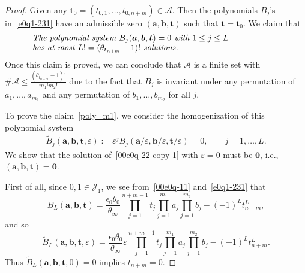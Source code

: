 \documentclass[10pt,a4paper]{amsart}
\numberwithin{equation}{section}
\begin{document}
\begin{proof}
Given any $\boldsymbol t_0=(t_{0,1},\dots,t_{0,n+m})\in \mathcal{A}$. Then the polynomials $B_j$'s in~\eqref{e0q1-231} have an admissible zero $(\boldsymbol a,\boldsymbol b,\boldsymbol t)$ such that $\boldsymbol t=\boldsymbol t_0$. We claim that
\begin{equation} \label{poly=m1}
 \parbox{\dimexpr\linewidth-5em}{\it
 The polynomial system $B_j(\boldsymbol a,\boldsymbol b,\boldsymbol t)=0$ with $1\leq j\leq L$\\ has at most $L!=(\theta_{t_{n+m}}-1)!$ solutions.
 }
\end{equation}
Once this claim is proved, we can conclude that $\mathcal{A}$ is a
finite set with $\# \mathcal{A}\leq
\frac{(\theta_{t_{n+m}}-1)!}{m_1!m_2!}$ due to the fact that $B_j$ is
invariant under any permutation of $a_1,\dots, a_{m_1}$ and any
permutation of $b_1,\dots, b_{m_2}$ for all $j$.

To prove the claim~\eqref{poly=m1}, we consider the homogenization of this polynomial system
\begin{equation}\label{00e0q-22-copy-1}
\begin{split}
\widetilde{B}_j(\boldsymbol a, \boldsymbol b,\boldsymbol t,\varepsilon):=\varepsilon^jB_j({\boldsymbol a}/\varepsilon, {\boldsymbol b}/\varepsilon, \boldsymbol t/\varepsilon)=0,\qquad j=1,\dots, L.
\end{split}
\end{equation}
We show that the solution of~\eqref{00e0q-22-copy-1} with $\varepsilon=0$ must be $\boldsymbol 0$,
i.e., $(\boldsymbol a, \boldsymbol b,\boldsymbol t)=\boldsymbol 0$.

First of all, since $0,1\in\mathcal{J}_1$, we see from~\eqref{00e0q-11} and~\eqref{e0q1-231} that
\begin{equation*}%
B_{L}(\boldsymbol a, \boldsymbol b,\boldsymbol t)=\frac{\epsilon_0\theta_0}{\theta_\infty} \prod_{j=1}^{n+m-1}t_j\prod_{j=1}^{m_1}a_j\prod_{j=1}^{m_2}b_j-(-1)^{L}
t_{n+m}^{L},
\end{equation*}
and so
\[\widetilde{B}_{L}(\boldsymbol a, \boldsymbol b,\boldsymbol t,\varepsilon)=\frac{\epsilon_0\theta_0}{\theta_\infty} \varepsilon \prod_{j=1}^{n+m-1}t_j\prod_{j=1}^{m_1}a_j\prod_{j=1}^{m_2}b_j-(-1)^{L}
t_{n+m}^{L}.\]
Thus $\widetilde{B}_{L}(\boldsymbol a, \boldsymbol b,\boldsymbol t,0)=0$ implies $t_{n+m}=0$.


\end{proof}
\end{document}
